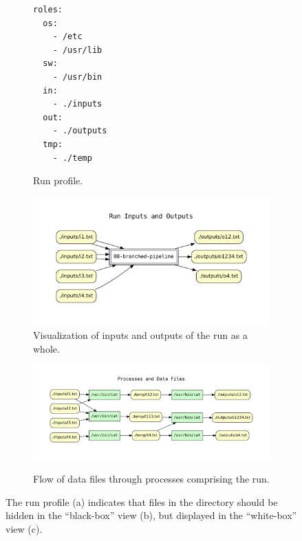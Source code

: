\begin{figure}[th]
        \centering          
\begin{subfigure}[c]{0.18\linewidth}
\begin{verbatim}
roles:
  os:
    - /etc
    - /usr/lib
  sw:
    - /usr/bin
  in:
    - ./inputs
  out:
    - ./outputs
  tmp:
    - ./temp
\end{verbatim}
  \vspace*{-1em}
            \caption{Run profile.}
        \end{subfigure}
\hfill
        \begin{subfigure}[c]{0.69\linewidth}
          \centering
            \includegraphics[width=0.92\linewidth]{cpr_run_inputs_outputs.pdf}
            \caption{Visualization of inputs and outputs of the run as a whole.}
            \label{subfig-blackbox}
        \end{subfigure} 

\medskip

\centering 
\begin{subfigure}[b]{0.9\linewidth}
        {\includegraphics[width=1.0\linewidth]{cpr_processes_and_data_files.pdf}}
        \caption{Flow of data files through processes comprising the run.}
        \label{subfig-whitebox}
    \end{subfigure}
\caption{The run profile (a) indicates that files in the  directory should be hidden in the ``black-box'' view (b), but displayed in the ``white-box'' view (c).}
\label{fig-cpr-example}
  \vspace*{-1.5em}
\end{figure}





